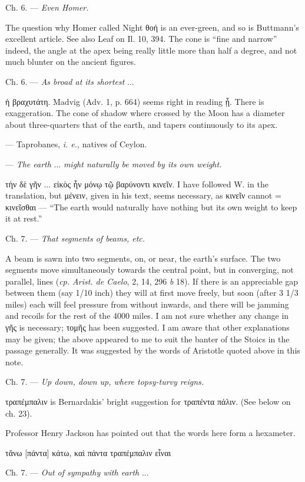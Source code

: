 \documentclass[a4paper, 11pt, oneside, polutonikogreek, english]{article}
\begin{document}
Ch. 6. --- \emph{Even Homer.}

The question why Homer called Night θοή is an ever-green, and so is Buttmann's excellent article. See also Leaf on Il. 10, 394. The cone is ``fine and narrow'' indeed, the angle at the apex being really little more than half a degree, and not much blunter on the ancient figures.

Ch. 6. --- \emph{As broad at its shortest} ...

ἡ βραχυτάτη. Madvig (Adv. 1, p. 664) seems right in reading ᾗ. There is exaggeration. The cone of shadow where crossed by the Moon has a diameter about three-quarters that of the earth, and tapers continuously to its apex.

--- Taprobanes, \emph{i. e.}, natives of Ceylon.

--- \emph{The earth} ... \emph{might naturally be moved by its own weight.}

τὴν δὲ γῆν ... εἰκὸς ἦν μόνῳ τῷ βαρύνοντι κινεῖν. I have followed W. in the translation, but μένειν, given in his text, seems necessary, as κινεῖν cannot = κινεῖσθαι --- ``The earth would naturally have nothing but its own weight to keep it at rest.''

Ch. 7. --- \emph{That segments of beams, etc.}

A beam is sawn into two segments, on, or near, the earth's surface. The two segments move simultaneously towards the central point, but in converging, not parallel, lines (\emph{cp. Arist. de Caelo}, 2, 14, 296 \emph{b} 18). If there is an appreciable gap between them (say 1/10 inch) they will at first move freely, but soon (after 3 1/3 miles) each will feel pressure from without inwards, and there will be jamming and recoils for the rest of the 4000 miles. I am not sure whether any change in γῆς is necessary; τομῆς has been suggested. I am aware that other explanations may be given; the above appeared to me to suit the banter of the Stoics in the passage generally. It was suggested by the words of Aristotle quoted above in this note.

Ch. 7. --- \emph{Up down, down up, where topsy-turvy reigns.}

τραπέμπαλιν is Bernardakis' bright suggestion for τραπέντα πάλιν. (See below on ch. 23).

Professor Henry Jackson has pointed out that the words here form a hexameter.

τἄνω [πάντα] κάτω, καὶ πάντα τραπέμπαλιν εἶναι

Ch. 7. --- \emph{Out of sympathy with earth} ...
\end{document}

